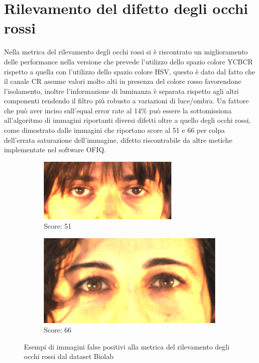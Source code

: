 \documentclass[12pt,a4paper,openright,twoside]{book}
\begin{document}
\section{Rilevamento del difetto degli occhi rossi}
Nella metrica del rilevamento degli occhi rossi si è riscontrato un miglioramento delle performance nella versione che prevede l'utilizzo dello spazio colore YCBCR rispetto a quella con l'utilizzo dello spazio colore HSV, questo è dato dal fatto che il canale CR assume valori molto alti in presenza del colore rosso favorendone l'isolamento, inoltre l'informazione di luminanza è separata rispetto agli altri componenti rendendo il filtro più robusto a variazioni di luce/ombra. Un fattore che può aver inciso sull'equal error rate al 14\% può essere la sottomissiona all'algoritmo di immagini riportanti diversi difetti oltre a quello degli occhi rossi, come dimostrato dalle immagini  che riportano score al 51 e 66 per colpa dell'errata saturazione dell'immagine, difetto riscontrabile da altre metiche implementate nel software OFIQ.
\begin{figure}[htbp]
    \centering
    \begin{subfigure}{0.49\textwidth}
        \centering
        \includegraphics[width=.7\linewidth]{figures/red_eye_false_negative_image_1.png}
        \caption{Score: 51}
    \end{subfigure}
    \hfill
    \begin{subfigure}{0.49\textwidth}
        \centering
        \includegraphics[width=.7\linewidth]{figures/red_eye_false_negative_image_2.png}
        \caption{Score: 66}
    \end{subfigure}
    \label{fig:red_eye_false_negative_images}
    \caption{Esempi di immagini false positivi alla metrica del rilevamento degli occhi rossi dal dataset Biolab}
\end{figure}
\end{document}
